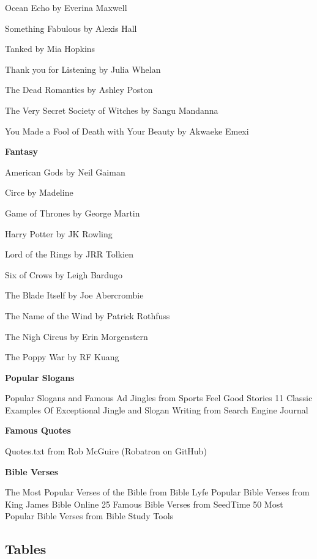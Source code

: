 \documentclass{article}
\begin{document}
Ocean Echo by Everina Maxwell

Something Fabulous by Alexis Hall

Tanked by Mia Hopkins

Thank you for Listening by Julia Whelan

The Dead Romantics by Ashley Poston

The Very Secret Society of Witches by Sangu Mandanna

You Made a Fool of Death with Your Beauty by Akwaeke Emexi

\textbf{Fantasy}

American Gods by Neil Gaiman

Circe by Madeline 

Game of Thrones by George Martin

Harry Potter by JK Rowling

Lord of the Rings by JRR Tolkien

Six of Crows by Leigh Bardugo

The Blade Itself by Joe Abercrombie

The Name of the Wind by Patrick Rothfuss

The Nigh Circus by Erin Morgenstern

The Poppy War by RF Kuang

\textbf{Popular Slogans}

Popular Slogans and Famous Ad Jingles from Sports Feel Good Stories
11 Classic Examples Of Exceptional Jingle and Slogan Writing from Search Engine Journal


\textbf{Famous Quotes}

Quotes.txt from Rob McGuire (Robatron on GitHub)


\textbf{Bible Verses}

The Most Popular Verses of the Bible from Bible Lyfe 
Popular Bible Verses from King James Bible Online
25 Famous Bible Verses from SeedTime
50 Most Popular Bible Verses from Bible Study Tools


\subsection{Tables}
\end{document}
